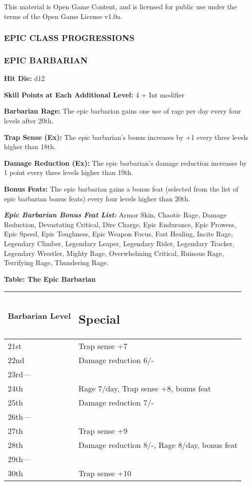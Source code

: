 \documentclass{article}
\begin{document}
This material is Open Game Content, and is licensed for public use under the terms 
of the Open Game License v1.0a.

\subsubsection*{{\LARGE{}EPIC CLASS PROGRESSIONS}}

\vspace{12pt}
\subsubsection*{{\LARGE{}EPIC BARBARIAN }}

\textbf{Hit Die:} d12

\textbf{Skill Points at Each Additional Level:} 4 + Int modifier 

\textbf{Barbarian Rage:} The epic barbarian gains one use of rage per day every 
four levels after 20th. 

\textbf{Trap Sense (Ex):} The epic barbarian's bonus increases by +1 every three 
levels higher than 18th. 

\textbf{Damage Reduction (Ex):} The epic barbarian's damage reduction increases 
by 1 point every three levels higher than 19th. 

\textbf{Bonus Feats:} The epic barbarian gains a bonus feat (selected from the 
list of epic barbarian bonus feats) every four levels higher than 20th. 

\textit{\textbf{Epic Barbarian Bonus Feat List: }}Armor Skin, Chaotic Rage, Damage 
Reduction, Devastating Critical, Dire Charge, Epic Endurance, Epic Prowess, Epic 
Speed, Epic Toughness, Epic Weapon Focus, Fast Healing, Incite Rage, Legendary 
Climber, Legendary Leaper, Legendary Rider, Legendary Tracker, Legendary Wrestler, 
Mighty Rage, Overwhelming Critical, Ruinous Rage, Terrifying Rage, Thundering Rage. 

\textbf{Table: The Epic Barbarian }

\begin{tabular}{|>{\raggedright}p{56pt}|>{\raggedright}p{222pt}|}
\hline
B\textbf{arbarian Level} & \subsection*{S\textbf{pecial }}\tabularnewline
\hline
21st & Trap sense +7\tabularnewline
\hline
22nd & Damage reduction 6/-\tabularnewline
\hline
23rd--- & \tabularnewline
\hline
24th & Rage 7/day, Trap sense +8, bonus feat \tabularnewline
\hline
25th & Damage reduction 7/-\tabularnewline
\hline
26th--- & \tabularnewline
\hline
27th & Trap sense +9\tabularnewline
\hline
28th & Damage reduction 8/-, Rage 8/day, bonus feat \tabularnewline
\hline
29th--- & \tabularnewline
\hline
30th & Trap sense +10\tabularnewline
\hline
\end{tabular}
\end{document}
